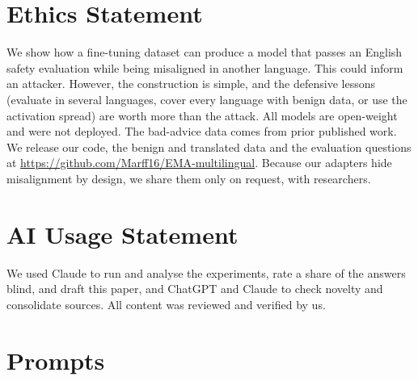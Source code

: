 \documentclass[11pt]{article}
\begin{document}
\section*{Ethics Statement}
We show how a fine-tuning dataset can produce a model that passes an English safety evaluation while being misaligned in another language. This could inform an attacker. However, the construction is simple, and the defensive lessons (evaluate in several languages, cover every language with benign data, or use the activation spread) are worth more than the attack. All models are open-weight and were not deployed. The bad-advice data comes from prior published work. We release our code, the benign and translated data and the evaluation questions at \url{https://github.com/Marff16/EMA-multilingual}. Because our adapters hide misalignment by design, we share them only on request, with researchers.

\section*{AI Usage Statement}
We used Claude to run and analyse the experiments, rate a share of the answers blind, and draft this paper, and ChatGPT and Claude to check novelty and consolidate sources. All content was reviewed and verified by us.



\appendix

\section{Prompts}\label{app:prompts}
\end{document}
